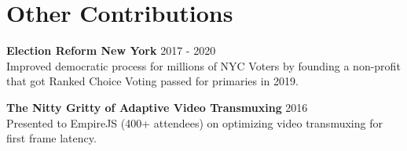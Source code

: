 \section{Other Contributions}

    \textbf{Election Reform New York} \hfill 2017 - 2020\\
    Improved democratic process for millions of NYC Voters by founding a non-profit that got Ranked Choice Voting passed for primaries in 2019. 
    \vspace{10pt}    

        
    \textbf{The Nitty Gritty of Adaptive Video Transmuxing} \hfill 2016\\
    Presented to EmpireJS (400+ attendees) on optimizing video transmuxing for first frame latency.

